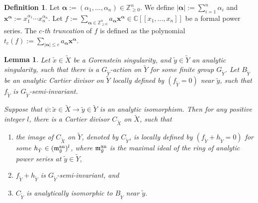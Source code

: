 \documentclass[11pt]{amsart}
\numberwithin{equation}{section}
\newcommand{\Cc}{\mathbb{C}}
\newcommand{\Zz}{\mathbb{Z}}
\newcommand{\fm}{\mathfrak{m}}
\newtheorem{lem}[thm]{Lemma}
\theoremstyle{definition}
\theoremstyle{definition}
\newtheorem{defn}[thm]{Definition}
\begin{document}


\begin{defn}\label{def: truncation}
Let $\bm{\alpha}:=(\alpha_1,\dots, \alpha_n)\in \Zz_{\geq 0}^n$. We define $|\bm{\alpha}|:=\sum_{i=1}^n\alpha_i$ and $\bm{x}^{\bm{\alpha}} :=x_1^{\alpha_1}\cdots x_n^{\alpha_n}$. Let $f:=\sum_{\bm{\alpha}\in \Zz^n_{\geq 0}} a_{\bm{\alpha}} \bm{x}^{\bm{\alpha}}\in \Cc[[x_1,\dots,x_n]]$ be a formal power series. The \emph{$c$-th truncation} of $f$ is defined as the polynomial $t_c(f):=\sum_{|\bm{\alpha}|\leq c} a_{\bm{\alpha}}\bm{x}^{\bm{\alpha}}$.
\end{defn}

\begin{lem}\label{lem: formal approximation divisors}
Let $\tilde{x}\in \tilde{X}$ be a Gorenstein singularity, and $\tilde{y}\in \tilde{Y}$ an analytic singularity, such that there is a $G_{\tilde{Y}}$-action on $\tilde{Y}$ for some finite group $G_{\tilde{Y}}$. Let $B_{\tilde{Y}}$ be an analytic Cartier divisor on $\tilde{Y}$ locally defined by $(f_{\tilde{Y}}=0)$ near $\tilde{y}$, such that $f_{\tilde{Y}}$ is $G_{\tilde{Y}}$-semi-invariant.

Suppose that $\psi:\tilde{x}\in \tilde{X}\to \tilde{y}\in \tilde{Y}$ is an analytic isomorphism. Then for any positive integer $l$, there is a Cartier divisor $C_{\tilde{X}}$ on $\tilde{X}$, such that
\begin{enumerate}
    \item  the image of $C_{\tilde{X}}$ on $\tilde{Y}$, denoted by $C_{\tilde{Y}}$, is locally defined by $(f_{\tilde{Y}}+h_{\tilde{Y}}=0)$ for some $h_{\tilde{Y}}\in (\fm_{\tilde{y}}^{\rm an})^l$, where $\fm_{\tilde{y}}^{\rm an}$ is the maximal ideal of the ring of analytic power series at $\tilde{y}\in \tilde{Y}$,
    \item $f_{\tilde{Y}}+h_{\tilde{Y}}$ is $G_{\tilde{Y}}$-semi-invariant, and
    \item $C_{\tilde{Y}}$ is analytically isomorphic to $B_{\tilde{Y}}$ near $\tilde{y}$.
\end{enumerate}
\end{lem}
\end{document}
